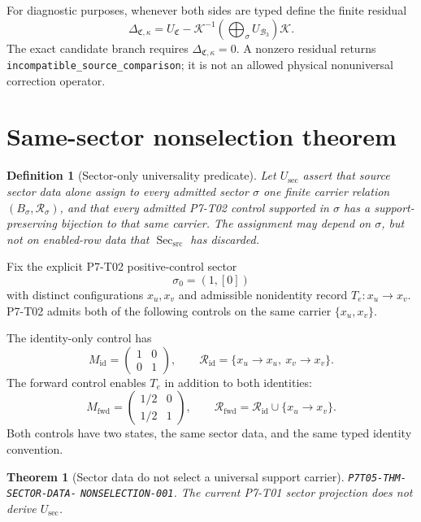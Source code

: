 \documentclass[11pt]{article}
\newtheorem{definition}{Definition}
\newtheorem{theorem}{Theorem}
\newcommand{\Sec}{\operatorname{Sec}_{\mathrm{src}}}
\newcommand{\Control}{\mathfrak C}
\newcommand{\Carrier}{\mathcal B_3}
\newcommand{\Kmap}{\mathcal K}
\newcommand{\Update}{U}
\newcommand{\Rel}{\mathcal R}
\begin{document}
For diagnostic purposes, whenever both sides are typed define the finite
residual
\[
 \Delta_{\Control,\kappa}
 =
 \Update_{\Control}
 -
 \Kmap^{-1}
 \left(\bigoplus_{\sigma}\Update_{\Carrier}\right)
 \Kmap.
\]
The exact candidate branch requires \(\Delta_{\Control,\kappa}=0\).
A nonzero residual returns
\texttt{incompatible\_source\_}\allowbreak\texttt{comparison}; it is
not an allowed physical nonuniversal correction operator.

\section{Same-sector nonselection theorem}

\begin{definition}[Sector-only universality predicate]
Let \(U_{\mathrm{sec}}\) assert that source sector data alone assign to every
admitted sector \(\sigma\) one finite carrier relation
\((B_\sigma,\Rel_\sigma)\), and that every admitted P7-T02 control supported
in \(\sigma\) has a support-preserving bijection to that same carrier.
The assignment may depend on \(\sigma\), but not on enabled-row data that
\(\Sec\) has discarded.
\end{definition}

Fix the explicit P7-T02 positive-control sector
\[
 \sigma_0=(1,[0])
\]
with distinct configurations \(x_u,x_v\) and admissible nonidentity record
\(T_e:x_u\to x_v\).  P7-T02 admits both of the following controls on the
same carrier \(\{x_u,x_v\}\).

The identity-only control has
\[
 M_{\mathrm{id}}=
 \begin{pmatrix}1&0\\0&1\end{pmatrix},
 \qquad
 \Rel_{\mathrm{id}}
 =\{x_u\to x_u,\ x_v\to x_v\}.
\]
The forward control enables \(T_e\) in addition to both identities:
\[
 M_{\mathrm{fwd}}=
 \begin{pmatrix}1/2&0\\1/2&1\end{pmatrix},
 \qquad
 \Rel_{\mathrm{fwd}}
 =\Rel_{\mathrm{id}}\cup\{x_u\to x_v\}.
\]
Both controls have two states, the same sector data, and the same typed
identity convention.

\begin{theorem}[Sector data do not select a universal support carrier]
\label{thm:nonselection}
\textup{\texttt{P7T05-THM-SECTOR-DATA-}\allowbreak
\texttt{NONSELECTION-001}.}
The current P7-T01 sector projection does not derive
\(U_{\mathrm{sec}}\).
\end{theorem}
\end{document}

